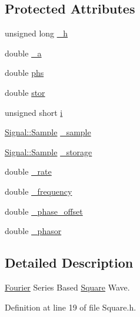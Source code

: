 \subsection*{Protected Attributes}
\begin{DoxyCompactItemize}
\item 
unsigned long \hyperlink{classDSG_1_1Fourier_1_1Square_a8d7bdc95bfdfc37d624ea80bbcf9b5b2}{\-\_\-h}
\item 
double \hyperlink{classDSG_1_1Fourier_1_1Square_a438011bf25e0a37742ec56b69b56e57c}{\-\_\-a}
\item 
double \hyperlink{classDSG_1_1Fourier_1_1Square_afa3d8499a142c5b786c675dcd79704f4}{phs}
\item 
double \hyperlink{classDSG_1_1Fourier_1_1Square_a2ddf0aaac29e59a58e144baadd88a100}{stor}
\item 
unsigned short \hyperlink{classDSG_1_1Fourier_1_1Square_a1fc677227d1631d4592bbbdfbe2358c8}{i}
\item 
\hyperlink{classDSG_1_1Signal_1_1Sample}{Signal\-::\-Sample} \hyperlink{classDSG_1_1Fourier_1_1FourierGenerator_aaf63683d2173cd41ff1d65b4c454e87a}{\-\_\-sample}
\item 
\hyperlink{classDSG_1_1Signal_1_1Sample}{Signal\-::\-Sample} \hyperlink{classDSG_1_1Fourier_1_1FourierGenerator_a43799227375e2d8b1354682e3a4fc935}{\-\_\-storage}
\item 
double \hyperlink{classDSG_1_1SignalGenerator_aa10f6c85d9adee901139ea7fb346f39d}{\-\_\-rate}
\item 
double \hyperlink{classDSG_1_1SignalGenerator_a67e296e3506dcdf09402c667cddff9ac}{\-\_\-frequency}
\item 
double \hyperlink{classDSG_1_1SignalGenerator_a9abf9d00c798e0fdca6314f17547758a}{\-\_\-phase\-\_\-offset}
\item 
double \hyperlink{classDSG_1_1SignalGenerator_ac2271b582bf699275f077ecb642a8cd9}{\-\_\-phasor}
\end{DoxyCompactItemize}


\subsection{Detailed Description}
\hyperlink{namespaceDSG_1_1Fourier}{Fourier} Series Based \hyperlink{classDSG_1_1Fourier_1_1Square}{Square} Wave. 

Definition at line 19 of file Square.\-h.



